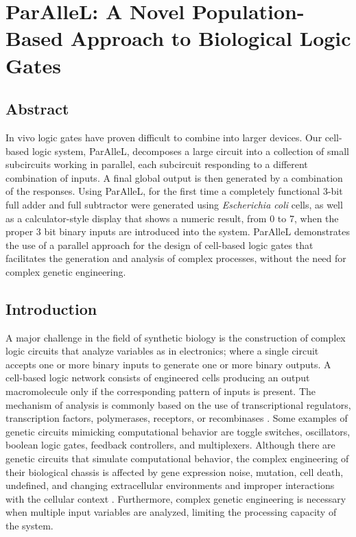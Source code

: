 \chapter{ParAlleL: A Novel Population-Based Approach to Biological Logic Gates}

\section{\textbf{Abstract }}

In vivo logic gates have proven difficult to combine into larger devices. 
Our cell-based logic system, ParAlleL, decomposes a large circuit into a collection of small subcircuits working in parallel,
each subcircuit responding to a different combination of inputs. 
A final global output is then generated by a combination of the responses. 
Using ParAlleL, for the first time a completely functional 3-bit full adder and full subtractor were generated using 
\textit{Escherichia coli} cells, as well as a calculator-style display that shows a numeric result, 
from 0 to 7, when the proper 3 bit binary inputs are introduced into the system. 
ParAlleL demonstrates the use of a parallel approach for the design of cell-based logic gates that facilitates 
the generation and analysis of complex processes, without the need for complex genetic engineering.

\section{\textbf{Introduction }}

A major challenge in the field of synthetic biology is the construction of complex logic circuits that analyze variables as in electronics; where a single circuit accepts one or more binary inputs to generate one or more binary outputs. A cell-based logic network consists of engineered cells producing an output macromolecule only if the corresponding pattern of inputs is present. The mechanism of analysis is commonly based on the use of transcriptional regulators, transcription factors, polymerases, receptors, or recombinases \cite{brenner2018synthetic}. Some examples of genetic circuits mimicking computational behavior are toggle switches, oscillators, boolean logic gates, feedback controllers, and multiplexers. Although there are genetic circuits that simulate computational behavior, the complex engineering of their biological chassis is affected by gene expression noise, mutation, cell death, undefined, and changing extracellular environments and improper interactions with the cellular context \cite{andrianantoandro2006synthetic}. Furthermore, complex genetic engineering is necessary when multiple input variables are analyzed, limiting the processing capacity of the system.

